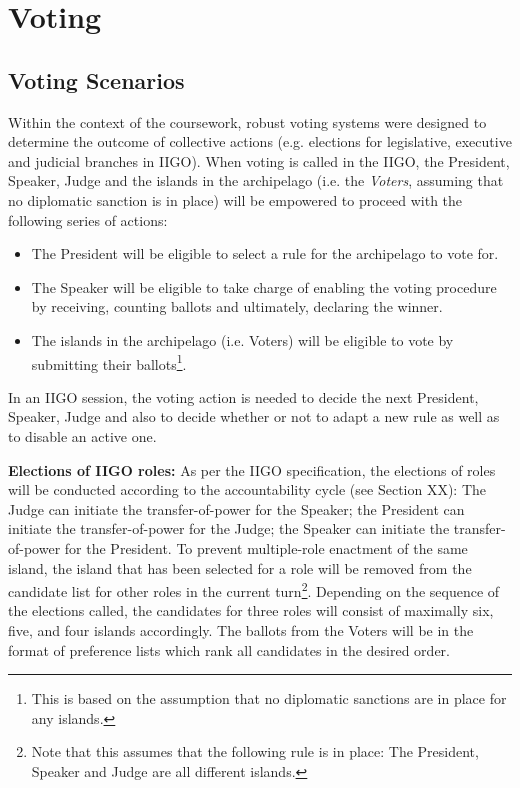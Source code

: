 \chapter{Voting}
\section{Voting Scenarios}
\label{sec:VotingScenarios}

Within the context of the coursework, robust voting systems were designed to determine the outcome of collective actions (e.g. elections for legislative, executive and judicial branches in IIGO).
When voting is called in the IIGO, the President, Speaker, Judge and the islands in the archipelago (i.e. the \emph{Voters}, assuming that no diplomatic sanction is in place) will be empowered to proceed with the following series of actions:
\begin{itemize}
    \item The President will be eligible to select a rule for the archipelago to vote for.
    \item The Speaker will be eligible to take charge of enabling the voting procedure by receiving, counting ballots and ultimately, declaring the winner.
    \item The islands in the archipelago (i.e. Voters) will be eligible to vote by submitting their ballots\footnote{This is based on the assumption that no diplomatic sanctions are in place for any islands.}.
\end{itemize}

In an IIGO session, the voting action is needed to decide the next President, Speaker, Judge and also to decide whether or not to adapt a new rule as well as to disable an active one.

\textbf{Elections of IIGO roles:} As per the IIGO specification, the elections of roles will be conducted according to the accountability cycle (see Section XX): The Judge can initiate the transfer-of-power for the Speaker; the President can initiate the transfer-of-power for the Judge; the Speaker can initiate the transfer-of-power for the President. To prevent multiple-role enactment of the same island, the island that has been selected for a role will be removed from the candidate list for other roles in the current turn\footnote{Note that this assumes that the following rule is in place: The President, Speaker and Judge are all different islands.}. Depending on the sequence of the elections called, the candidates for three roles will consist of maximally six, five, and four islands accordingly. The ballots from the Voters will be in the format of preference lists which rank all candidates in the desired order.


